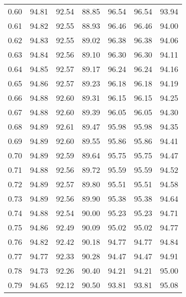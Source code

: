 \begin{tabular}{|c|c|c|c|c|c|c|}
      0.60 &     94.81 &     92.54 &      88.85 &   96.54 &      96.54 &         93.94 \\
      0.61 &     94.82 &     92.55 &      88.93 &   96.46 &      96.46 &         94.00 \\
      0.62 &     94.83 &     92.55 &      89.02 &   96.38 &      96.38 &         94.06 \\
      0.63 &     94.84 &     92.56 &      89.10 &   96.30 &      96.30 &         94.11 \\
      0.64 &     94.85 &     92.57 &      89.17 &   96.24 &      96.24 &         94.16 \\
      0.65 &     94.86 &     92.57 &      89.23 &   96.18 &      96.18 &         94.19 \\
      0.66 &     94.88 &     92.60 &      89.31 &   96.15 &      96.15 &         94.25 \\
      0.67 &     94.88 &     92.60 &      89.39 &   96.05 &      96.05 &         94.30 \\
      0.68 &     94.89 &     92.61 &      89.47 &   95.98 &      95.98 &         94.35 \\
      0.69 &     94.89 &     92.60 &      89.55 &   95.86 &      95.86 &         94.41 \\
      0.70 &     94.89 &     92.59 &      89.64 &   95.75 &      95.75 &         94.47 \\
      0.71 &     94.88 &     92.56 &      89.72 &   95.59 &      95.59 &         94.52 \\
      0.72 &     94.89 &     92.57 &      89.80 &   95.51 &      95.51 &         94.58 \\
      0.73 &     94.89 &     92.56 &      89.90 &   95.38 &      95.38 &         94.64 \\
      0.74 &     94.88 &     92.54 &      90.00 &   95.23 &      95.23 &         94.71 \\
      0.75 &     94.86 &     92.49 &      90.09 &   95.02 &      95.02 &         94.77 \\
      0.76 &     94.82 &     92.42 &      90.18 &   94.77 &      94.77 &         94.84 \\
      0.77 &     94.77 &     92.33 &      90.28 &   94.47 &      94.47 &         94.91 \\
      0.78 &     94.73 &     92.26 &      90.40 &   94.21 &      94.21 &         95.00 \\
      0.79 &     94.65 &     92.12 &      90.50 &   93.81 &      93.81 &         95.08 \\

\end{tabular}
